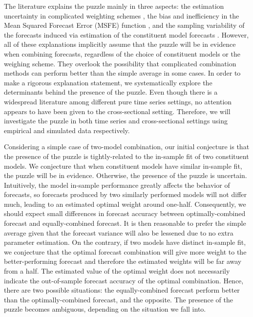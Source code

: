 \documentclass{monashthesis}
\begin{document}
The literature explains the puzzle mainly in three aspects: the estimation uncertainty in complicated weighting schemes \autocite{SW98,SW04,SW09}, the bias and inefficiency in the Mean Squared Forecast Error (MSFE) function \autocite{E11,CMVW16}, and the sampling variability of the forecasts induced via estimation of the constituent model forecasts \autocite{ZMFP22,FZMP23}. However, all of these explanations implicitly assume that the puzzle will be in evidence when combining forecasts, regardless of the choice of constituent models or the weighing scheme. They overlook the possibility that complicated combination methods can perform better than the simple average in some cases. In order to make a rigorous explanation statement, we systematically explore the determinants behind the presence of the puzzle. Even though there is a widespread literature among different pure time series settings, no attention appears to have been given to the cross-sectional setting. Therefore, we will investigate the puzzle in both time series and cross-sectional settings using empirical and simulated data respectively.

Considering a simple case of two-model combination, our initial conjecture is that the presence of the puzzle is tightly-related to the in-sample fit of two constituent models. We conjecture that when constituent models have similar in-sample fit, the puzzle will be in evidence. Otherwise, the presence of the puzzle is uncertain. Intuitively, the model in-sample performance greatly affects the behavior of forecasts, so forecasts produced by two similarly performed models will not differ much, leading to an estimated optimal weight around one-half. Consequently, we should expect small differences in forecast accuracy between optimally-combined forecast and equally-combined forecast. It is then reasonable to prefer the simple average given that the forecast variance will also be lessened due to no extra parameter estimation. On the contrary, if two models have distinct in-sample fit, we conjecture that the optimal forecast combination will give more weight to the better-performing forecast and therefore the estimated weights will be far away from a half. The estimated value of the optimal weight does not necessarily indicate the out-of-sample forecast accuracy of the optimal combination. Hence, there are two possible situations: the equally-combined forecast perform better than the optimally-combined forecast, and the opposite. The presence of the puzzle becomes ambiguous, depending on the situation we fall into.
\end{document}

